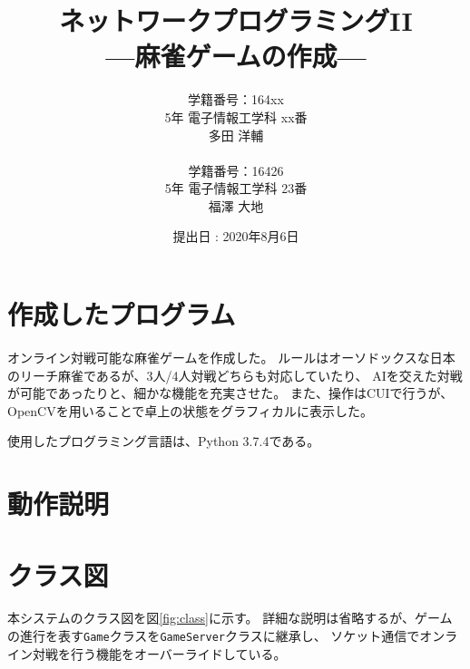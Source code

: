 \documentclass[a4j,titlepage]{jsarticle}
\begin{document}
\begin{titlepage}
  \title{\huge{ネットワークプログラミングI\hspace{-.1em}I} \\ \LARGE{---麻雀ゲームの作成---}}
  \author{
    学籍番号：164xx \\ 5年 電子情報工学科 xx番 \\ 多田 洋輔 \\ \\
    学籍番号：16426 \\ 5年 電子情報工学科 23番 \\ 福澤 大地
  }
	\date{提出日 : 2020年8月6日}
  \maketitle
\end{titlepage}


\section{作成したプログラム}
オンライン対戦可能な麻雀ゲームを作成した。
ルールはオーソドックスな日本のリーチ麻雀であるが、3人/4人対戦どちらも対応していたり、
AIを交えた対戦が可能であったりと、細かな機能を充実させた。
また、操作はCUIで行うが、OpenCVを用いることで卓上の状態をグラフィカルに表示した。

使用したプログラミング言語は、Python 3.7.4である。


\section{動作説明}


\section{クラス図}
本システムのクラス図を図\ref{fig:class}に示す。
詳細な説明は省略するが、ゲームの進行を表す\texttt{Game}クラスを\texttt{GameServer}クラスに継承し、
ソケット通信でオンライン対戦を行う機能をオーバーライドしている。
\end{document}
